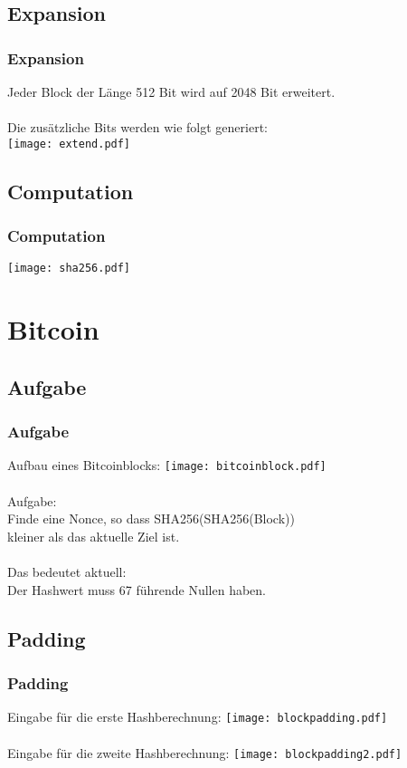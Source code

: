 \documentclass{beamer}
\begin{document}
\subsection{Expansion}
  \begin{frame}
    \frametitle{Expansion}
    Jeder Block der Länge 512 Bit wird auf 2048 Bit erweitert.\\
    ~\\
    Die zusätzliche Bits werden wie folgt generiert:\\
    \texttt{[image: extend.pdf]}
  \end{frame}
\subsection{Computation}
  \begin{frame}
    \frametitle{Computation}
    \texttt{[image: sha256.pdf]}
  \end{frame}

\section{Bitcoin}
\subsection{Aufgabe}
  \begin{frame}
    \frametitle{Aufgabe}
    Aufbau eines Bitcoinblocks:
    \texttt{[image: bitcoinblock.pdf]}\\
    ~\\
    Aufgabe:\\
    Finde eine Nonce, so dass SHA256(SHA256(Block))\\
    kleiner als das aktuelle Ziel ist.\\
    ~\\
    Das bedeutet aktuell:\\
    Der Hashwert muss 67 führende Nullen haben.
  \end{frame}
\subsection{Padding}
  \begin{frame}
    \frametitle{Padding}
    Eingabe für die erste Hashberechnung:
    \texttt{[image: blockpadding.pdf]}\\
    ~\\
    Eingabe für die zweite Hashberechnung:
    \texttt{[image: blockpadding2.pdf]}\\
  \end{frame}
\end{document}
